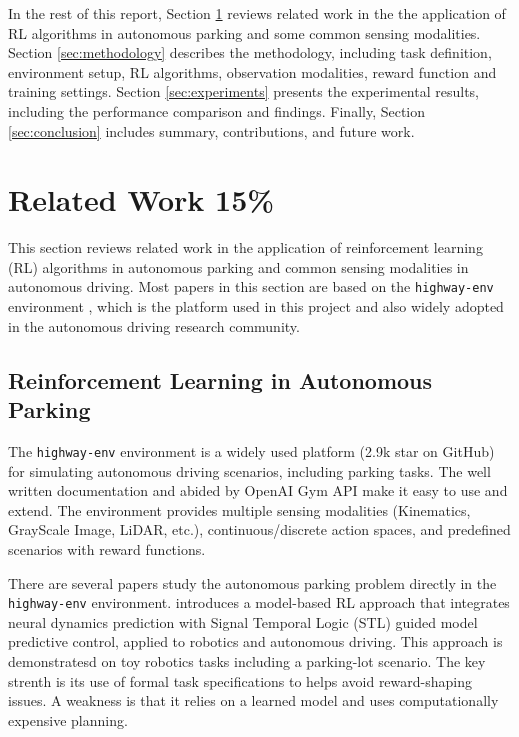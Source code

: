 \documentclass{article}
\begin{document}
In the rest of this report, Section \ref{sec:related_work} reviews related work in the the application of RL algorithms in autonomous parking and some common sensing modalities. Section \ref{sec:methodology} describes the methodology, including task definition, environment setup, RL algorithms, observation modalities, reward function and training settings. Section \ref{sec:experiments} presents the experimental results, including the performance comparison and findings. Finally, Section \ref{sec:conclusion} includes summary, contributions, and future work.

\newpage

\section{Related Work 15\%}\label{sec:related_work}

This section reviews related work in the application of reinforcement learning (RL) algorithms in autonomous parking and common sensing modalities in autonomous driving. Most papers in this section are based on the \texttt{highway-env} environment \cite{highway-env}, which is the platform used in this project and also widely adopted in the autonomous driving research community.

\subsection{Reinforcement Learning in Autonomous Parking}

The \texttt{highway-env} environment \cite{highway-env} is a widely used platform (2.9k star on GitHub) for simulating autonomous driving scenarios, including parking tasks. The well written documentation and abided by OpenAI Gym API make it easy to use and extend. The environment provides multiple sensing modalities (Kinematics, GrayScale Image, LiDAR, etc.), continuous/discrete action spaces, and predefined scenarios with reward functions.

There are several papers study the autonomous parking problem directly in the \texttt{highway-env} environment. \citet{kapoor2020model} introduces a model-based RL approach that integrates neural dynamics prediction with Signal Temporal Logic (STL) guided model predictive control, applied to robotics and autonomous driving. This approach is demonstratesd on toy robotics tasks including a parking-lot scenario. The key strenth is its use of formal task specifications to helps avoid reward-shaping issues. A weakness is that it relies on a learned model and uses computationally expensive planning.
\end{document}
